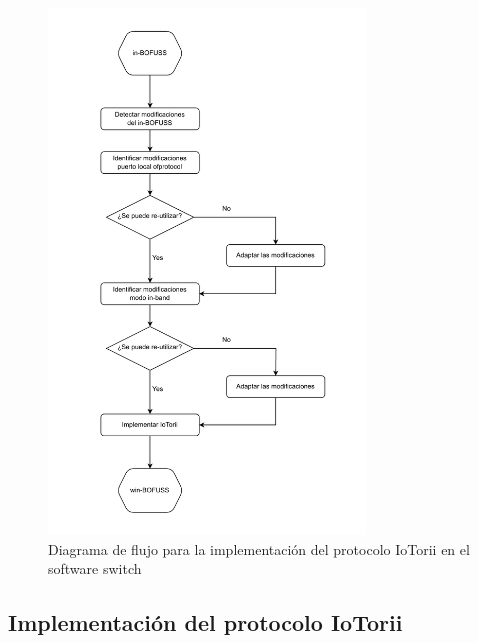 \begin{figure}[ht!]
    \centering
    \includegraphics[width=0.75\textwidth]{archivos/img/dev/winBOFUSS.pdf}
    \caption{Diagrama de flujo para la implementación del protocolo IoTorii en el software switch }
    \label{fig:WIN-BOFUSS}
\end{figure}

\subsection{Implementación del protocolo IoTorii}

